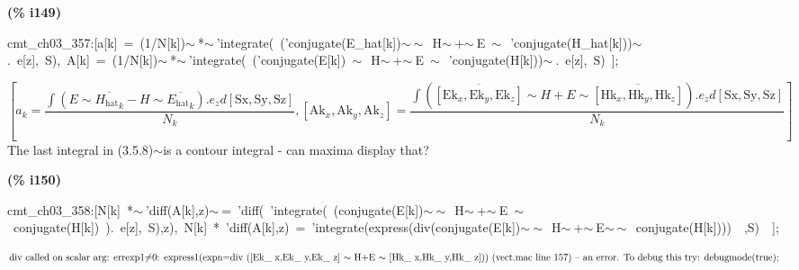 \documentclass[fleqn]{article}
\begin{document}
\noindent
\begin{minipage}[t]{4.000000em}\color{red}\bfseries
(\% i149)	
\end{minipage}
\begin{minipage}[t]{\textwidth}\color{blue}
cmt\_ch03\_357:[a[k]\ =\ (1/N[k])\ensuremath{\sim\ }*\ensuremath{\sim\ }'integrate(\ ('conjugate(E\_hat[k])\ensuremath{\sim\ }\ensuremath{\sim\ }\ H\ensuremath{\sim\ }+\ensuremath{\sim\ }E\ \ensuremath{\sim\ }\ 'conjugate(H\_hat[k]))\ensuremath{\sim\ }.\ e[z],\ S),\ A[k]\ =\ (1/N[k])\ensuremath{\sim\ }*\ensuremath{\sim\ }'integrate(\ ('conjugate(E[k])\ \ensuremath{\sim\ }\ H\ensuremath{\sim\ }+\ensuremath{\sim\ }E\ \ensuremath{\sim\ }\ 'conjugate(H[k]))\ensuremath{\sim\ }.\ e[z],\ S)\ ];
\end{minipage}
\[\displaystyle \tag{cmt\_ ch03\_ 357} 
\operatorname{[}{a_k}=\frac{\int {\left. \left( E\operatorname{\sim  }\overline{{{{H_{\ensuremath{\mathrm{hat}}}}}_k}}-H\operatorname{\sim  }\overline{{{{E_{\ensuremath{\mathrm{hat}}}}}_k}}\right) \ensuremath{\mathrm{ . }}{e_z}d\left[ \ensuremath{\mathrm{Sx}}\operatorname{,}\ensuremath{\mathrm{Sy}}\operatorname{,}\ensuremath{\mathrm{Sz}}\right] \right.}}{{N_k}}\operatorname{,}\left[ {{\ensuremath{\mathrm{Ak}}}_x}\operatorname{,}{{\ensuremath{\mathrm{Ak}}}_y}\operatorname{,}{{\ensuremath{\mathrm{Ak}}}_z}\right] =\frac{\int {\left. \left( \overline{\left[ {{\ensuremath{\mathrm{Ek}}}_x}\operatorname{,}{{\ensuremath{\mathrm{Ek}}}_y}\operatorname{,}{{\ensuremath{\mathrm{Ek}}}_z}\right] }\operatorname{\sim  }H+E\operatorname{\sim  }\overline{\left[ {{\ensuremath{\mathrm{Hk}}}_x}\operatorname{,}{{\ensuremath{\mathrm{Hk}}}_y}\operatorname{,}{{\ensuremath{\mathrm{Hk}}}_z}\right] }\right) \ensuremath{\mathrm{ . }}{e_z}d\left[ \ensuremath{\mathrm{Sx}}\operatorname{,}\ensuremath{\mathrm{Sy}}\operatorname{,}\ensuremath{\mathrm{Sz}}\right] \right.}}{{N_k}}\operatorname{]}\mbox{}
\]
The last integral in (3.5.8)\ensuremath{\sim }is a contour integral - can maxima display that?


\noindent
\begin{minipage}[t]{4.000000em}\color{red}\bfseries
(\% i150)	
\end{minipage}
\begin{minipage}[t]{\textwidth}\color{blue}
cmt\_ch03\_358:[N[k]\ *\ensuremath{\sim\ }'diff(A[k],z)\ensuremath{\sim\ }=\ 'diff(\ 'integrate(\ (conjugate(E[k])\ensuremath{\sim\ }\ensuremath{\sim\ }\ H\ensuremath{\sim\ }+\ensuremath{\sim\ }E\ \ensuremath{\sim\ }\ conjugate(H[k])\ ).\ e[z],\ S),z),\ N[k]\ *\ 'diff(A[k],z)\ =\ 'integrate(express(div(conjugate(E[k])\ensuremath{\sim\ }\ensuremath{\sim\ }\ H\ensuremath{\sim\ }+\ensuremath{\sim\ }E\ensuremath{\sim\ }\ensuremath{\sim\ }\ conjugate(H[k])))\ \ ,S)\ \ ];
\end{minipage}
\[\displaystyle \mbox{}\\\mbox{%
div called on scalar arg: }\ensuremath{\mathrm{errexp1
}}\mbox{%
\ensuremath{\neq}0: express1(expn=div ([Ek\_ x,Ek\_ y,Ek\_ z] \ensuremath{\sim } H+E \ensuremath{\sim } [Hk\_ x,Hk\_ y,Hk\_ z])) (vect.mac line 157)
}\mbox{%
 -- an error. To debug this try: debugmode(true);}\mbox{}
\]
\end{document}
